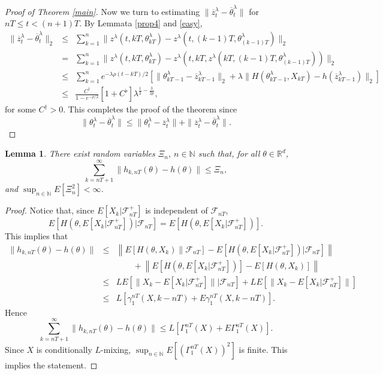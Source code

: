 \documentclass[a4paper]{article}
\newtheorem{lemma}[theorem]{Lemma}
\begin{document}
\begin{proof}[ Proof of Theorem \ref{main}]
Now we turn to
estimating $\|\overline{z}_t^{\lambda}-\overline{\theta}^{\lambda}_t\|$ for $nT \le t < (n+1)T$. By Lemmata \ref{prop4}
and \ref{easy},
\begin{eqnarray*}
	\|\overline{z}_t^{\lambda}-\overline{\theta}^{\lambda}_t\|_2 &\leq &
	\sum_{k=1}^n \|z^{\lambda}(t,kT,\theta^{\lambda}_{kT}) - z^{\lambda}(t, (k-1)T, \theta^{\lambda}_{(k-1)T})\|_2  \\
	&=& \sum_{k=1}^n \|z^{\lambda}(t,kT,\theta^{\lambda}_{kT}) - z^{\lambda}(t, kT, z^{\lambda}(kT,(k-1)T, \theta^{\lambda}_{(k-1)T}))\|_2 \\
	&\leq & \sum_{k = 1}^{n} e^{-\lambda\rho(t-kT)/2}
	\left[\|\theta^{\lambda}_{kT -1} - \overline{z}^{\lambda}_{kT-1}\|_2 +
	\lambda \|H(\theta^{\lambda}_{kT-1},X_{kT}) - h(\overline{z}^{\lambda}_{kT-1})\|_2\right]\\
	&\leq & \frac{C^{\dagger}}{1-e^{-\rho/2}}\left[1+C^{\flat}\right]\lambda^{\frac{1}{2} - \frac{3}{2p}},
\end{eqnarray*}
for some $C^{\dagger}>0$.
This completes the proof of the theorem since
$$
\|\theta^{\lambda}_t-\overline{\theta}^{\lambda}_t\|\leq \|{\theta}^{\lambda}_t-\overline{z}_t^{\lambda}\|+
\|\overline{z}_t^{\lambda}-\overline{\theta}^{\lambda}_t\|.
$$
\end{proof}

\begin{lemma}\label{kaaka}
	There exist random variables $\Xi_{n}$, $n\in\mathbb{N}$ such that, for all $\theta\in\mathbb{R}^d$,
	$$
	\sum_{k=nT+1}^{\infty}\|h_{k,nT}(\theta)-h(\theta)\|\leq \Xi_n,
	$$
	and $\sup_{n\in\mathbb{N}}E[\Xi^2_n]<\infty$.
\end{lemma}
\begin{proof}
	Notice that, since $E[X_k\vert\mathcal{F}_{nT}^+]$ is independent
	of $\mathcal{F}_{nT}$,
	$$
	E[H(\theta,E[X_k\vert\mathcal{F}_{nT}^+])\vert\mathcal{F}_{nT}]=
	E[H(\theta, E[X_k\vert\mathcal{F}_{nT}^+])].
	$$
	This implies that
	\begin{eqnarray*}
		\|h_{k,nT}(\theta)-h(\theta)\| &\leq&
		\left\|E[H(\theta,X_k)\|\mathcal{F}_{nT}]-
		E[H(\theta,E[X_k\vert\mathcal{F}_{nT}^+])\vert\mathcal{F}_{nT}]\right\| \\
		&& \qquad	+ \left\|E[H(\theta, E[X_k\vert\mathcal{F}_{nT}^+])]-E[H(\theta,X_k)]\right\| \\
		&\leq&
		LE[\|X_k-E[X_k\vert\mathcal{F}_{nT}^+]\|\vert\mathcal{F}_{nT}]
		+LE[\|X_k-E[X_k\vert\mathcal{F}_{nT}^+]\|]\\
		 &\leq&
		L[\gamma_1^{nT}(X,k-nT) + E\gamma_1^{nT}(X,k-nT)].
	\end{eqnarray*}
	Hence
	$$
	\sum_{k=nT+1}^{\infty}\|h_{k,nT}(\theta)-h(\theta)\|\leq L[\Gamma_1^{nT}(X)
	+E\Gamma_1^{nT}(X)].
	$$
	Since $X$ is conditionally $L$-mixing,
	$\sup_{n\in\mathbb{N}}E[(\Gamma_1^{nT}(X))^2]$ is finite. This implies the statement.
\end{proof}
\end{document}
